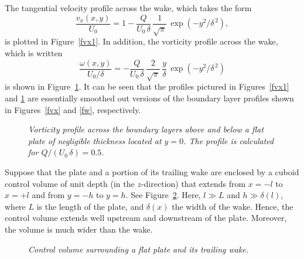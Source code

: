 The tangential velocity profile across the wake, which takes the form
\begin{equation}\label{ej6.100}
\frac{v_x(x,y)}{U_0} = 1 - \frac{Q}{U_0\,\delta}\,\frac{1}{\sqrt{\pi}}\,\exp(-y^2/\delta^{\,2}),
\end{equation}
is plotted in Figure~\ref{fvx1}. In addition, the vorticity profile across the wake, which is
written
\begin{equation}\label{ej6.101}
\frac{\omega(x,y)}{U_0/\delta}= -\frac{Q}{U_0\,\delta}\,\frac{2}{\sqrt{\pi}}\,\frac{y}{\delta}\,\exp(-y^2/\delta^{\,2})
\end{equation}
is shown in Figure~\ref{fw1}. It can be seen that the profiles pictured in Figures~\ref{fvx1} and \ref{fw1} are essentially smoothed out versions of the boundary
layer profiles shown in Figures~\ref{fvx} and \ref{fw}, respectively. 

\begin{figure}
\epsfysize=3.25in
\centerline{}
\caption{\em Vorticity profile across the boundary layers above and below a flat plate of negligible
thickness located at $y=0$. The profile is calculated for $Q/(U_0\,\delta)=0.5$. }\label{fw1}
\end{figure}

Suppose that the plate and a portion of its trailing wake are enclosed by a cuboid control volume of unit depth (in the $z$-direction)
that extends from $x=-l$ to $x=+l$ and from $y=-h$ to $y=h$. See Figure~\ref{frect}. Here, $l\gg L$ and $h\gg \delta(l)$, where $L$ is the
length of the plate, and $\delta(x)$ the width of the wake. Hence, the control volume extends well upstream and
 downstream of the plate. Moreover, the volume is much wider than the wake. 
 
\begin{figure}
\epsfysize=3.25in
\centerline{}
\caption{\em Control volume surrounding a flat plate and its trailing wake.}\label{frect}
\end{figure}

